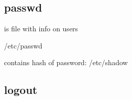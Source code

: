
\subsection{passwd}
is file with info on users

/etc/passwd


contains hash of password:
/etc/shadow


\subsection{logout}


